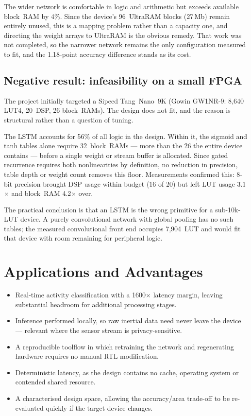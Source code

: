 \documentclass[11pt,a4paper]{article}
\begin{document}
The wider network is comfortable in logic and arithmetic but exceeds available
block~RAM by 4\%. Since the device's 96~UltraRAM blocks (27\,Mb) remain entirely
unused, this is a mapping problem rather than a capacity one, and directing the
weight arrays to UltraRAM is the obvious remedy. That work was not completed, so
the narrower network remains the only configuration measured to fit, and the
1.18-point accuracy difference stands as its cost.

\subsection{Negative result: infeasibility on a small FPGA}

The project initially targeted a Sipeed Tang~Nano~9K (Gowin GW1NR-9: 8{,}640
LUT4, 20~DSP, 26 block~RAMs). The design does not fit, and the reason is
structural rather than a question of tuning.

The LSTM accounts for 56\% of all logic in the design. Within it, the sigmoid
and tanh tables alone require 32~block~RAMs --- more than the 26 the entire
device contains --- before a single weight or stream buffer is allocated. Since
gated recurrence requires both nonlinearities by definition, no reduction in
precision, table depth or weight count removes this floor. Measurements
confirmed this: 8-bit precision brought DSP usage within budget (16 of 20) but
left LUT usage 3.1$\times$ and block~RAM 4.2$\times$ over.

The practical conclusion is that an LSTM is the wrong primitive for a
sub-10k-LUT device. A purely convolutional network with global pooling has no
such tables; the measured convolutional front end occupies 7{,}904~LUT and would
fit that device with room remaining for peripheral logic.

\section{Applications and Advantages}

\begin{itemize}
  \item Real-time activity classification with a 1600$\times$ latency margin,
        leaving substantial headroom for additional processing stages.
  \item Inference performed locally, so raw inertial data need never leave the
        device --- relevant where the sensor stream is privacy-sensitive.
  \item A reproducible toolflow in which retraining the network and
        regenerating hardware requires no manual RTL modification.
  \item Deterministic latency, as the design contains no cache, operating
        system or contended shared resource.
  \item A characterised design space, allowing the accuracy/area trade-off to be
        re-evaluated quickly if the target device changes.
\end{itemize}
\end{document}
